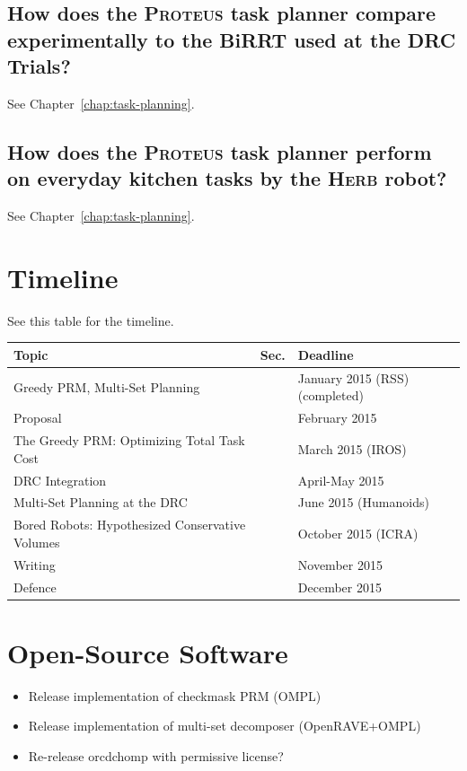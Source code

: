 \documentclass{report}
\begin{document}
{\subsection{How does the \textsc{Proteus} task planner
   compare experimentally to the BiRRT used at the DRC Trials?}
\label{ques:drc-compare}

See Chapter~\ref{chap:task-planning}.

\subsection{How does the \textsc{Proteus} task planner
   perform on everyday kitchen tasks by the \textsc{Herb} robot?}
\label{ques:herb-performance}

See Chapter~\ref{chap:task-planning}.

}%

\section{Timeline}

See this table for the timeline.

\begin{center}
\begin{tabular}{lll}
\hline
Topic & Sec. & Deadline \\
\hline
Greedy PRM, Multi-Set Planning & & January 2015 (RSS) (completed) \\
Proposal & & February 2015 \\
The Greedy PRM: Optimizing Total Task Cost & & March 2015 (IROS) \\
DRC Integration & & April-May 2015 \\
Multi-Set Planning at the DRC & & June 2015 (Humanoids) \\
Bored Robots: Hypothesized Conservative Volumes & & October 2015 (ICRA) \\
Writing & & November 2015 \\
Defence & & December 2015 \\
\hline
\end{tabular}
\end{center}

\section{Open-Source Software}

\begin{itemize}
\item Release implementation of checkmask PRM (OMPL)
\item Release implementation of multi-set decomposer (OpenRAVE+OMPL)
\item Re-release orcdchomp with permissive license?
\end{itemize}
\end{document}
